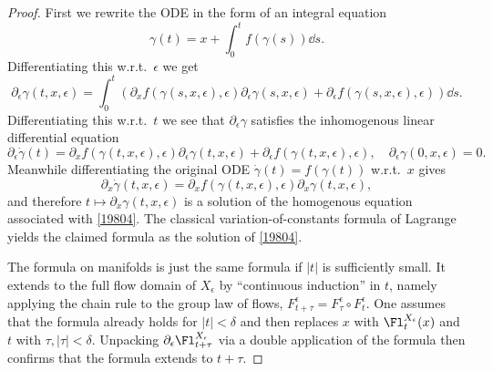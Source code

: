 \begin{proof}
    First we rewrite the ODE in the form of an integral equation
    \[\gamma(t)=x+\int_0^t f(\gamma(s))\dd s.\]
    Differentiating this w.r.t.\ $\epsilon$ we get
    \[\partial_\epsilon\gamma(t,x,\epsilon)=\int_0^t \left(\partial_x f(\gamma(s,x,\epsilon),\epsilon)\partial_\epsilon\gamma(s,x,\epsilon)+\partial_\epsilon f(\gamma(s,x,\epsilon),\epsilon)\right)\dd s.\]
    Differentiating this w.r.t.\ $t$ we see that $\partial_\epsilon \gamma$ satisfies the inhomogenous linear differential equation
    \[\partial_\epsilon \dot\gamma(t)=\partial_xf(\gamma(t,x,\epsilon),\epsilon)\partial_\epsilon \gamma(t,x,\epsilon)+\partial_\epsilon f(\gamma(t,x,\epsilon),\epsilon),\quad \partial_\epsilon\gamma(0,x,\epsilon)=0.\label{19804}\]
    Meanwhile differentiating the original ODE $\dot\gamma(t)=f(\gamma(t))$ w.r.t.\ $x$ gives
    \[ \partial_x\dot \gamma(t,x,\epsilon)=\partial_xf(\gamma(t,x,\epsilon),\epsilon)\partial_x\gamma(t,x,\epsilon),\]
    and therefore $t\mapsto \partial_x \gamma(t,x,\epsilon)$ is a solution of the homogenous equation associated with \eqref{19804}. The classical variation-of-constants formula of Lagrange yields the claimed formula as the solution of \eqref{19804}.

    The formula on manifolds is just the same formula if $|t|$ is sufficiently small. It extends to the full flow domain of $X_\epsilon$ by ``continuous induction'' in $t$, namely applying the chain rule to the group law of flows, $F^\epsilon_{t+\tau}=F^\epsilon_\tau\circ F^\epsilon_t$. One assumes that the formula already holds for $|t|<\delta$ and then replaces $x$ with $\Fl_t^{X_\epsilon}(x)$ and $t$ with $\tau,|\tau|<\delta$. Unpacking $\partial_\epsilon \Fl_{t+\tau}^{X_\epsilon}$ via a double application of the formula then confirms that the formula extends to $t+\tau$.
\end{proof}

